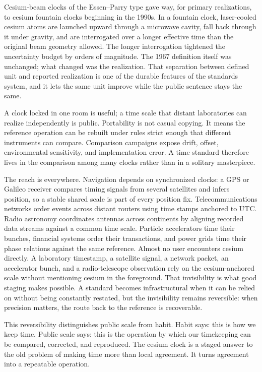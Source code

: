Cesium-beam clocks of the Essen--Parry type gave way, for primary
realizations, to cesium fountain clocks beginning in the 1990s. In a
fountain clock, laser-cooled cesium atoms are launched upward through a
microwave cavity, fall back through it under gravity, and are
interrogated over a longer effective time than the original beam
geometry allowed. The longer interrogation tightened the uncertainty
budget by orders of magnitude. The 1967 definition itself was unchanged;
what changed was the realization. That separation between defined unit
and reported realization is one of the durable features of the
standards system, and it lets the same unit improve while the public
sentence stays the same.

A clock locked in one room is useful; a time scale that distant
laboratories can realize independently is public. Portability is not
casual copying. It means the reference operation can be rebuilt under
rules strict enough that different instruments can compare. Comparison
campaigns expose drift, offset, environmental sensitivity, and
implementation error. A time standard therefore lives in the comparison among many clocks rather
than in a solitary masterpiece.

The reach is everywhere. Navigation depends on synchronized clocks: a GPS
or Galileo receiver compares timing signals from several satellites and
infers position, so a stable shared scale is part of every position fix.
Telecommunications networks order events across distant routers using
time stamps anchored to UTC. Radio astronomy coordinates antennas across
continents by aligning recorded data streams against a common time
scale. Particle accelerators time their bunches, financial systems
order their transactions, and power grids time their phase relations
against the same reference. Almost no user encounters cesium directly. A
laboratory timestamp, a satellite signal, a network packet, an
accelerator bunch, and a radio-telescope observation rely on the
cesium-anchored scale without mentioning cesium in the foreground. That
invisibility is what good staging makes possible. A standard becomes
infrastructural when it can be relied on without being constantly
restated, but the invisibility remains reversible: when precision
matters, the route back to the reference is recoverable.

This reversibility distinguishes public scale from habit. Habit says: this
is how we keep time. Public scale says: this is the operation by which
our timekeeping can be compared, corrected, and reproduced. The cesium
clock is a staged answer to the old problem of making time more than
local agreement. It turns agreement into a repeatable operation.

